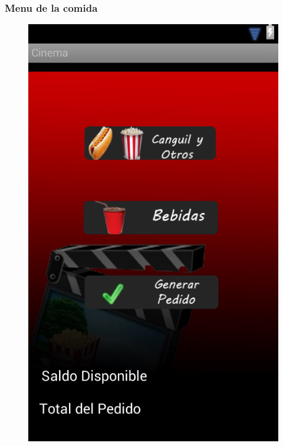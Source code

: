 \documentclass{beamer}
\begin{document}
\begin{frame}[allowframbreaks]
\frametitle{Menu de la comida}
\begin{figure}[h]
\centering
\includegraphics[height=0.8\textheight]{menucompra.png}
\end{figure}
\end{frame}
\end{document}
